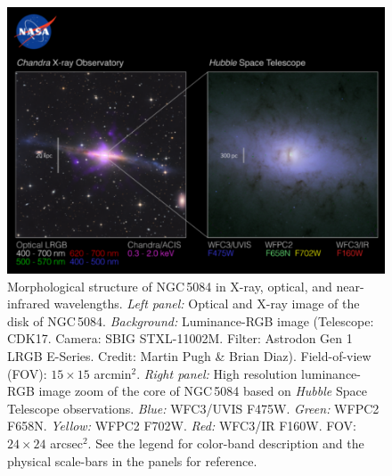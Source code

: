 \documentclass[modern]{CORE-AAS/aastex631}
\begin{document}
\begin{figure}[t!]
\begin{center}
\includegraphics[trim={0 10 0 100}, clip, width=\textwidth]{FIGURES/Composition_NGC5084_poster_v6_paper.png}
\caption{Morphological structure of NGC\,5084 in X-ray, optical, and near-infrared wavelengths. \emph{Left panel:} Optical and X-ray image of 
the disk of NGC\,5084. \emph{Background:} Luminance-RGB image (Telescope: CDK17. Camera: SBIG STXL-11002M. Filter: Astrodon Gen 1 LRGB E-Series. Credit: Martin Pugh \& Brian Diaz). Field-of-view (FOV): $15\times15$ arcmin$^{2}$. \emph{Right panel:} High resolution luminance-RGB image zoom of the core of NGC\,5084 based on \emph{Hubble} Space Telescope observations. \emph{Blue:} WFC3/UVIS F475W. \emph{Green:} WFPC2 F658N. \emph{Yellow:} WFPC2 F702W. \emph{Red:} WFC3/IR F160W.  FOV: $24\times24$ arcsec$^{2}$. See the legend for color-band description and the physical scale-bars in the panels for reference.} 
\label{fig:NGC5084_poster}
\end{center}
\end{figure}

\end{document}
